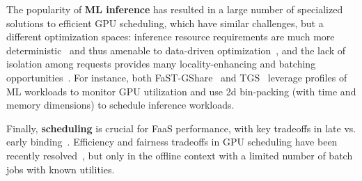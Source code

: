 The popularity of \textbf{ML inference} has resulted in a large number of specialized solutions to efficient GPU scheduling, which have similar challenges, but a different optimization spaces: inference resource requirements are much more deterministic~\cite{gujarati2020serving} and thus amenable to data-driven optimization~\cite{ali2022optimizing}, and the lack of isolation among requests provides many locality-enhancing and batching opportunities~\cite{yang2022infless, satzke2020efficient}. 
For instance, both FaST-GShare~\cite{gu2023fast} and TGS~\cite{tgs_wu2023transparent} leverage profiles of ML workloads to monitor GPU utilization and use 2d bin-packing (with time and memory dimensions) to schedule inference workloads.



Finally, \textbf{scheduling} is crucial for FaaS performance, with key tradeoffs in late vs. early binding~\cite{kaffes2021practical, kaffes_hermod_2022}.
Efficiency and fairness tradeoffs in GPU scheduling have been recently resolved~\cite{mo_optimal_2024}, but only in the offline context with a limited number of batch jobs with known utilities. 

